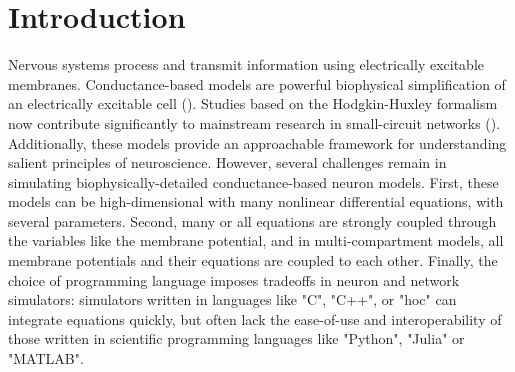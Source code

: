 \documentclass{frontiersSCNS} %
\begin{document}
%
%
%
%
%
%


\section{Introduction}
\label{sec:intro}

Nervous systems process and transmit information using electrically excitable membranes. Conductance-based models are powerful biophysical simplification of an electrically excitable cell (\cite{hodgkinQuantitativeDescriptionMembrane1952}). Studies based on the Hodgkin-Huxley formalism now contribute significantly to mainstream research in small-circuit networks (\cite{marderTheoryMotion1995, prinzComputationalApproachesNeuronal2010, prinzInsightsModelsRhythmic2006}). Additionally, these models provide an approachable framework for understanding salient principles of neuroscience. However, several challenges remain in simulating biophysically-detailed conductance-based neuron models. First, these models can be high-dimensional with many nonlinear differential equations, with several parameters. Second, many or all equations are strongly coupled through the variables like the membrane potential, and in multi-compartment models, all membrane potentials and their equations are coupled to each other. Finally, the choice of programming language imposes tradeoffs in neuron and network simulators: simulators written in languages like "C", "C++", or "hoc" can integrate equations quickly, but often lack the ease-of-use and interoperability of those written in scientific programming languages like "Python", "Julia" or "MATLAB". 
\end{document}
